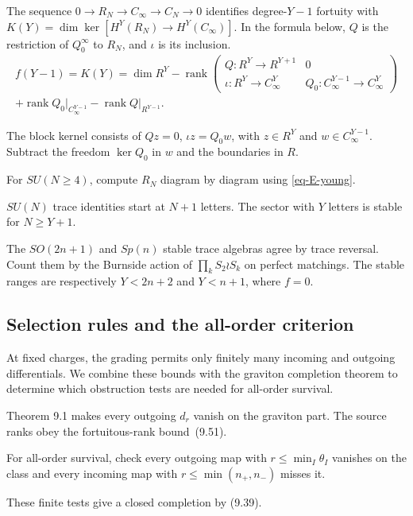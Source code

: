 \documentclass[11pt]{article}
\numberwithin{equation}{section}
\numberwithin{figure}{section}
\numberwithin{table}{section}
\begin{document}
The sequence $0\to R_N\to C_\infty\to C_N\to0$ identifies degree-$Y-1$ fortuity with $K(Y)=\dim\ker[H^Y(R_N)\to H^Y(C_\infty)]$. In the formula below, $Q$ is the restriction of $Q_0^\infty$ to $R_N$, and $\iota$ is its inclusion.
\begin{equation}\label{eq-E-K}
\begin{gathered}f(Y-1)=K(Y)=\dim R^Y-\operatorname{rank}\begin{pmatrix}Q:R^Y\to R^{Y+1}&0\\ \iota:R^Y\to C^Y_\infty&Q_0:C^{Y-1}_\infty\to C^Y_\infty\end{pmatrix}\\ +\operatorname{rank}Q_0\big|_{C^{Y-1}_\infty}-\operatorname{rank}Q\big|_{R^{Y-1}}.\end{gathered}
\end{equation}

The block kernel consists of $Qz=0$, $\iota z=Q_0w$, with $z\in R^Y$ and $w\in C_\infty^{Y-1}$. Subtract the freedom $\ker Q_0$ in $w$ and the boundaries in $R$.

For $SU(N\ge4)$, compute $R_N$ diagram by diagram using \eqref{eq-E-young}.

$SU(N)$ trace identities start at $N+1$ letters. The sector with $Y$ letters is stable for $N\ge Y+1$.

The $SO(2n+1)$ and $Sp(n)$ stable trace algebras agree by trace reversal. Count them by the Burnside action of $\prod_kS_2\wr S_k$ on perfect matchings. The stable ranges are respectively $Y<2n+2$ and $Y<n+1$, where $f=0$.

\subsection{Selection rules and the all-order criterion}\label{sec-E-select}

At fixed charges, the grading permits only finitely many incoming and outgoing differentials. We combine these bounds with the graviton completion theorem to determine which obstruction tests are needed for all-order survival.

Theorem 9.1 makes every outgoing $d_r$ vanish on the graviton part. The source ranks obey the fortuitous-rank bound~(9.51).

For all-order survival, check every outgoing map with $r\le\min_I\theta_I$ vanishes on the class and every incoming map with $r\le\min(n_+,n_-)$ misses it.

These finite tests give a closed completion by (9.39).
\end{document}
